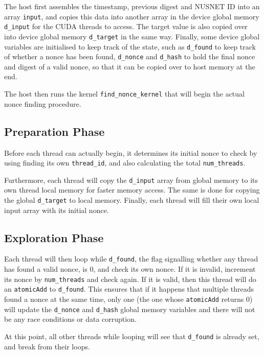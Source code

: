 \documentclass[12pt]{article}
\begin{document}
\bigbreak \noindent The host first assembles the timestamp, previous digest and NUSNET ID into an array \verb!input!, and copies this data into another array in the device global memory \verb!d_input! for the CUDA threads to access. The target value is also copied over into device global memory \verb!d_target! in the same way. Finally, some device global variables are initialised to keep track of the state, such as \verb!d_found! to keep track of whether a nonce has been found, \verb!d_nonce! and \verb!d_hash! to hold the final nonce and digest of a valid nonce, so that it can be copied over to host memory at the end.

\bigbreak \noindent The host then runs the kernel \verb!find_nonce_kernel! that will begin the actual nonce finding procedure.

\subsection{Preparation Phase}

Before each thread can actually begin, it determines its initial nonce to check by using finding its own \verb!thread_id!, and also calculating the total \verb!num_threads!.

\bigbreak \noindent Furthermore, each thread will copy the \verb!d_input! array from global memory to its own thread local memory for faster memory access. The same is done for copying the global \verb!d_target! to local memory. Finally, each thread will fill their own local input array with its initial nonce.

\subsection{Exploration Phase}

Each thread will then loop while \verb!d_found!, the flag signalling whether any thread has found a valid nonce, is 0, and check its own nonce. If it is invalid, increment its nonce by \verb!num_threads! and check again. If it is valid, then this thread will do an \verb!atomicAdd! to \verb!d_found!. This ensures that if it happens that multiple threads found a nonce at the same time, only one (the one whose \verb!atomicAdd! returns 0) will update the \verb!d_nonce! and \verb!d_hash! global memory variables and there will not be any race conditions or data corruption.

\bigbreak \noindent At this point, all other threads while looping will see that \verb!d_found! is already set, and break from their loops.
\end{document}
